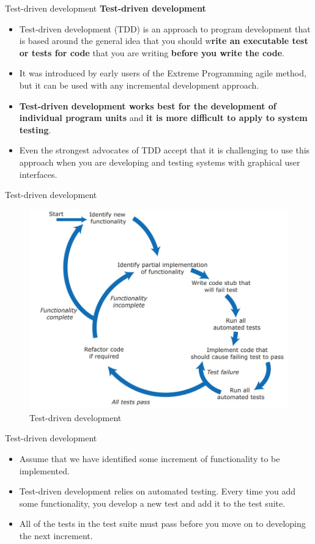 \documentclass{beamer}
\begin{document}
\begin{frame}{Test-driven development}
	\textbf{Test-driven development}
	\begin{itemize}
		\item Test-driven development (TDD) is an approach to program development that is based around the general idea that you should w\textbf{rite an executable test or tests for code} that you are writing \textbf{before you write the code}. 
		\item It was introduced by early users of the Extreme Programming agile method, but it can be used with any incremental development approach.
		\item \textbf{Test-driven development works best for the development of individual program units} and \textbf{it is more difficult to apply to system testing}. 
		\item Even the strongest advocates of TDD accept that it is challenging to use this approach when you are developing and testing systems with graphical user interfaces.
	\end{itemize}
\end{frame}
\begin{frame}{Test-driven development}
	\begin{figure}
		\includegraphics[scale=.4]{img/m3_31}
		\caption{Test-driven development}
	\end{figure}
\end{frame}
\begin{frame}{Test-driven development}
	\begin{itemize}
		\item Assume that we have identified some increment of functionality to be implemented. 
		\item Test-driven development relies on automated testing. Every time you add some functionality, you develop a new test and add it to the test suite. 
		\item All of the tests in the test suite must pass before you move on to developing the next increment.
		
	\end{itemize}
\end{frame}
\end{document}
